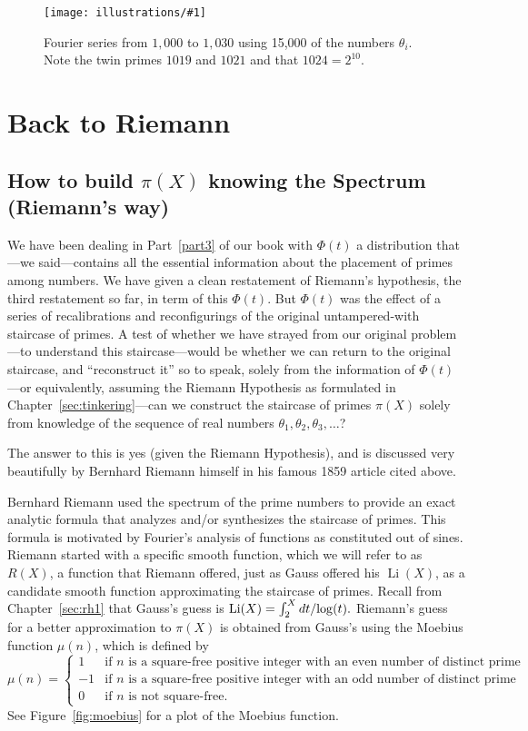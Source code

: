\documentclass[openany]{book}
\DeclareMathOperator{\Li}{Li}
\newcommand{\ill}[3]{%
   \begin{figure}[H]%
   \vspace{-2ex}
   \centering%
   \texttt{[image: illustrations/\#1]}%
   \caption{#3}%
   \vspace{-2ex}
    \end{figure}}
\theoremstyle{plain}
\theoremstyle{definition}
\newcommand{\RH}{Riemann Hypothesis\index{Riemann Hypothesis}}
\begin{document}
 \ill{phi_cos_sum_1010_1026_15000}{.7}{Fourier series from $1,000$ to
   $1,030$ using 15,000 of the numbers $\theta_i$.  Note the twin
   primes $1019$ and $1021$ and that $1024=2^{10}$.}

 
\part{Back to Riemann\label{part4}}


\chapter[Building $\pi(X)$ knowing the Spectrum]{How to build $\pi(X)$ knowing the Spectrum (Riemann's way)}


  We have been dealing in Part~\ref{part3} of our book with $\Phi(t)$ a
  distribution that---we said---contains all the essential information
  about the placement of primes among numbers. We have given a clean
  restatement of Riemann's hypothesis, the third restatement so far,
  in term of this $\Phi(t)$.  But $\Phi(t)$ was the effect of a series
  of recalibrations and reconfigurings of the original untampered-with
  staircase of primes.  A test of whether we have strayed from our
  original problem---to understand this staircase---would be whether
  we can return to the original staircase, and ``reconstruct it'' so to
  speak, solely from the information of $\Phi(t)$---or equivalently,
  assuming the \RH{} as formulated in Chapter~\ref{sec:tinkering}---can 
  we construct the staircase of primes $\pi(X)$ solely
  from knowledge of the sequence of real numbers $\theta_1,
  \theta_2,\theta_3,\dots$?
  
  


  The answer to this is yes (given the \RH{}), and is discussed very
  beautifully by Bernhard Riemann himself in his famous 1859 article
  cited above.

  Bernhard Riemann used the spectrum of the prime numbers to provide
  an exact analytic formula that analyzes and/or synthesizes the
  staircase of primes.  This formula is motivated by Fourier's
  analysis of functions as constituted out of sines.  Riemann started
  with a specific smooth function, which we will refer to as $R(X)$, a
  function that Riemann offered, just as Gauss offered his $\Li(X)$,
  as a candidate smooth function approximating the staircase of
  primes.  Recall from Chapter~\ref{sec:rh1} that Gauss's guess is
  $\Li(X)= \int_2^{X}dt/{\rm log}(t).$ Riemann's guess for a better
  approximation to $\pi(X)$ is obtained from Gauss's using the Moebius
  function $\mu(n)$, which is defined by
$$
 \mu(n) = \begin{cases} 
    1 & 
       \mbox{if $n$ is a square-free positive integer with an even number of distinct prime factors}\\
    -1& \mbox{if $n$ is a square-free positive integer with an odd number of distinct prime factors}\\ 
    0 & \mbox{if $n$ is not square-free.} 
 \end{cases} 
 $$
 See Figure~\ref{fig:moebius} for a plot of the Moebius function. 
 
\end{document}
